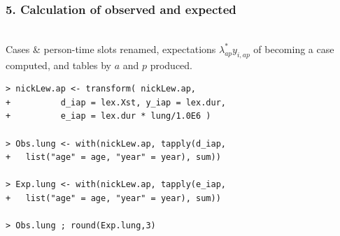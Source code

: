 \documentclass[handout,12pt]{beamer}
\begin{document}
\begin{frame}[fragile]
 \frametitle{5. Calculation of observed and expected}
\ \\
Cases \& person-time slots renamed, expectations $\lambda_{ap}^* y_{i,ap}$ of becoming a case computed,
and tables by $a$ and $p$ produced.
{\small
\renewcommand{\baselinestretch}{0.9}  
\begin{verbatim}
> nickLew.ap <- transform( nickLew.ap, 
+          d_iap = lex.Xst, y_iap = lex.dur, 
+          e_iap = lex.dur * lung/1.0E6 )

> Obs.lung <- with(nickLew.ap, tapply(d_iap,
+   list("age" = age, "year" = year), sum))

> Exp.lung <- with(nickLew.ap, tapply(e_iap,
+   list("age" = age, "year" = year), sum))

> Obs.lung ; round(Exp.lung,3)
\end{verbatim}  
\renewcommand{\baselinestretch}{1.0} 
}

\end{frame}
\end{document}
